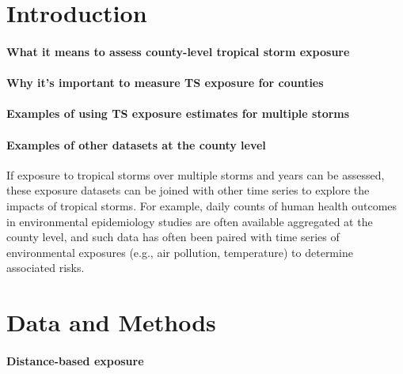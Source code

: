 \documentclass[]{elsarticle} %
\begin{document}
\section{Introduction}\label{introduction}

\paragraph{What it means to assess county-level tropical storm
exposure}\label{what-it-means-to-assess-county-level-tropical-storm-exposure}

\paragraph{Why it's important to measure TS exposure for
counties}\label{why-its-important-to-measure-ts-exposure-for-counties}

\paragraph{Examples of using TS exposure estimates for multiple
storms}\label{examples-of-using-ts-exposure-estimates-for-multiple-storms}

\paragraph{Examples of other datasets at the county
level}\label{examples-of-other-datasets-at-the-county-level}

If exposure to tropical storms over multiple storms and years can be
assessed, these exposure datasets can be joined with other time series
to explore the impacts of tropical storms. For example, daily counts of
human health outcomes in environmental epidemiology studies are often
available aggregated at the county level, and such data has often been
paired with time series of environmental exposures (e.g., air pollution,
temperature) to determine associated risks.

\section{Data and Methods}\label{data-and-methods}

\paragraph{Distance-based exposure}\label{distance-based-exposure}
\end{document}
